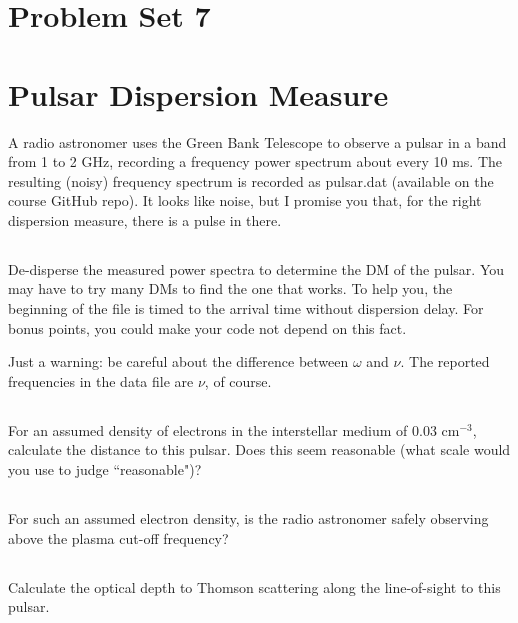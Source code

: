\documentclass[11pt]{article}
\begin{document}
\pagestyle{empty}

\section*{\centering Problem Set 7}

\section{Pulsar Dispersion Measure}

A radio astronomer uses the Green Bank Telescope to observe a pulsar
in a band from 1 to 2 GHz, recording a frequency power spectrum about every 10 ms.  The resulting
(noisy) frequency spectrum is recorded as pulsar.dat (available on the course GitHub repo).  It looks like
noise, but
I promise you that, for the right dispersion measure, there is a pulse in there.

\subsection{}
De-disperse the measured power spectra to determine the
DM of the pulsar.  You may have to try many DMs to find the one that works.
To help you, the beginning of the file is timed to the arrival time without dispersion delay.  For bonus
points, you could make your code not depend on this fact.

Just a warning: be careful about the difference between $\omega$ and $\nu$.  The reported frequencies in
the data file are $\nu$, of course.

\subsection{}
For an assumed density of electrons in the interstellar medium of 0.03 cm$^{-3}$, calculate the
distance to this pulsar. Does this seem reasonable (what scale would you use to judge ``reasonable")?

\subsection{}
For such an assumed electron density, is the radio astronomer safely observing above the plasma cut-off frequency?

\subsection{}
Calculate the optical depth to Thomson scattering along the line-of-sight to this pulsar.
\end{document}
